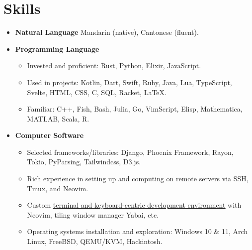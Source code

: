\documentclass[letterpaper,11pt]{article}
\newcommand{\uhref}[2]{\href{#1}{\underline{#2}}}
\begin{document}
\section{Skills}
\begin{itemize}[leftmargin=0.5cm, label={}]
    \item \textbf{Natural Language}\quad
    Mandarin (native), Cantonese (fluent).\vspace{-4pt}
    \item \textbf{Programming Language}\vspace{-4pt}
    \begin{itemize}\small
        \item Invested and proficient: Rust, Python, Elixir, JavaScript.
        \item Used in projects:
        Kotlin, Dart, Swift, Ruby, Java, Lua, TypeScript,
        Svelte, HTML, CSS, C, SQL, Racket, \LaTeX{}.
        \item Familiar: C++, Fish, Bash, Julia, Go, VimScript, Elisp,
        Mathematica, MATLAB, Scala, R.\vspace{-4pt}
    \end{itemize}
    \item \textbf{Computer Software}\vspace{-4pt}
    \begin{itemize}\small
        \item Selected frameworks/libraries:
        Django, Phoenix Framework, Rayon, Tokio, PyParsing, Tailwindcss, D3.js.
        \item Rich experience in setting up and computing on remote servers via
        SSH, Tmux, and Neovim.
        \item Custom \uhref{https://github.com/SichangHe/.config}
        {terminal and keyboard-centric development environment}
        with Neovim, tiling window manager Yabai, etc.
        \item Operating systems installation and exploration:
        Windows 10 \& 11, Arch Linux, FreeBSD, QEMU/KVM, Hackintosh.
    \end{itemize}
\end{itemize}
\end{document}
